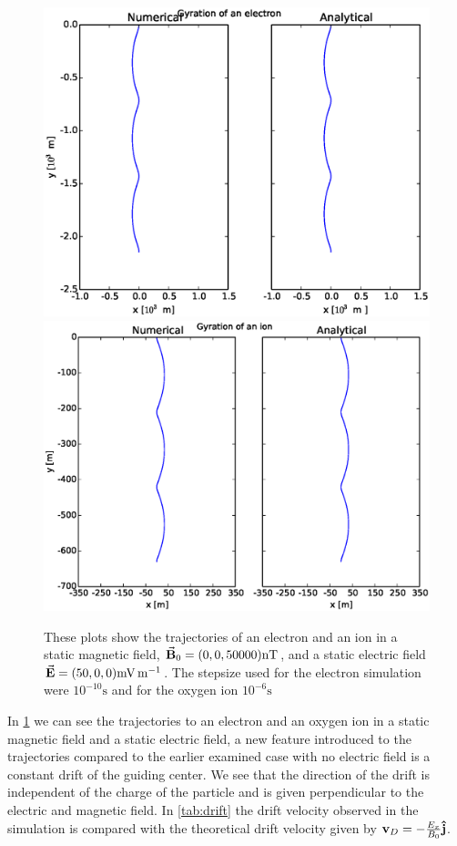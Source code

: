 \documentclass[x11names]{article}
\begin{document}
      \begin{figure}
            \includegraphics[width = 0.5\linewidth]{../source/ExBelectron}
            \includegraphics[width = 0.5\linewidth]{../source/ExBion}
            \caption{These plots show the trajectories of an electron and an ion in a static magnetic field, \(\va{B}_0 = (0,0,50000) \si{\nano\tesla}\), and a static electric field \( \va{E} = (50,0,0)  \si{\milli\volt\per\meter}\). The stepsize used for the electron simulation were \(10^{-10} \si{\second}\) and for the oxygen ion \(10^{-6} \si{\second}\)}
            \label{fig:ExBDrift}
      \end{figure}

      In \cref{fig:ExBDrift} we can see the trajectories to an electron and an oxygen ion in a static magnetic field and a static electric field, a new feature introduced to the trajectories compared to the earlier examined case with no electric field is a constant drift of the guiding center. We see that the direction of the drift is independent of the charge of the particle and is given perpendicular to the electric and magnetic field. In \cref{tab:drift} the drift velocity observed in the simulation is compared with the theoretical drift velocity given by \(\vb{v}_D = -\frac{E_x}{B_0}\vu{j}\).
\end{document}
